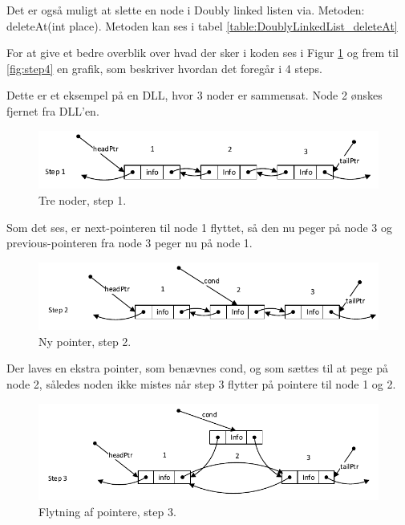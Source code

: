 Det er også muligt at slette en node i Doubly linked listen via. Metoden: deleteAt(int place). Metoden kan ses i tabel \ref{table:DoublyLinkedList_deleteAt}



For at give et bedre overblik over hvad der sker i koden ses i Figur \ref{fig:step1} og frem til \ref{fig:step4} en grafik, som beskriver hvordan det foregår i 4 steps.

\clearpage

Dette er et eksempel på en DLL, hvor 3 noder er sammensat. Node 2 ønskes fjernet fra DLL’en. 

\begin{figure}[ht]
\centering
\includegraphics[width=\textwidth-5cm]{../fig/linkedNodStep1.pdf}
\caption{Tre noder, step 1.}
\label{fig:step1}
\end{figure}

Som det ses, er next-pointeren til node 1 flyttet, så den nu peger på node 3 og previous-pointeren fra node 3 peger nu på node 1. 

\begin{figure}[ht]
\centering
\includegraphics[width=\textwidth-5cm]{../fig/linkedNodStep2.pdf}
\caption{Ny pointer, step 2.}
\label{fig:step2}
\end{figure}


Der laves en ekstra pointer, som benævnes cond, og som sættes til at pege på node 2, således noden ikke mistes når step 3 flytter på pointere til node 1 og 2.

\begin{figure}[ht]
\centering
\includegraphics[width=\textwidth-5cm]{../fig/linkedNodStep3.pdf}
\caption{Flytning af pointere, step 3.}
\label{fig:step3}
\end{figure}

